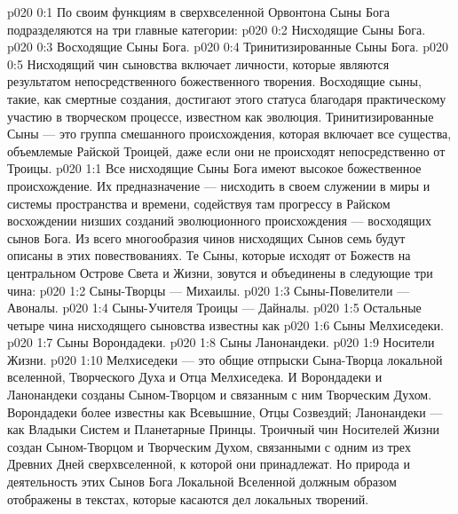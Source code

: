 \author{Совершенствователь Мудрости}
\vs p020 0:1 По своим функциям в сверхвселенной Орвонтона Сыны Бога подразделяются на три главные категории:
\vs p020 0:2 \bibnobreakspace Нисходящие Сыны Бога.
\vs p020 0:3 \bibnobreakspace Восходящие Сыны Бога.
\vs p020 0:4 \bibnobreakspace Тринитизированные Сыны Бога.
\vs p020 0:5 \pc Нисходящий чин сыновства включает личности, которые являются результатом непосредственного божественного творения. Восходящие сыны, такие, как смертные создания, достигают этого статуса благодаря практическому участию в творческом процессе, известном как эволюция. Тринитизированные Сыны --- это группа смешанного происхождения, которая включает все существа, объемлемые Райской Троицей, даже если они не происходят непосредственно от Троицы.
\vs p020 1:1 Все нисходящие Сыны Бога имеют высокое божественное происхождение. Их предназначение --- нисходить в своем служении в миры и системы пространства и времени, содействуя там прогрессу в Райском восхождении низших созданий эволюционного происхождения --- восходящих сынов Бога. Из всего многообразия чинов нисходящих Сынов семь будут описаны в этих повествованиях. Те Сыны, которые исходят от Божеств на центральном Острове Света и Жизни, зовутся  и объединены в следующие три чина:
\vs p020 1:2 \bibnobreakspace Сыны\hyp{}Творцы --- Михаилы.
\vs p020 1:3 \bibnobreakspace Сыны\hyp{}Повелители --- Авоналы.
\vs p020 1:4 \bibnobreakspace Сыны\hyp{}Учителя Троицы --- Дайналы.
\vs p020 1:5 \pc Остальные четыре чина нисходящего сыновства известны как 
\vs p020 1:6 \bibnobreakspace Сыны Мелхиседеки.
\vs p020 1:7 \bibnobreakspace Сыны Ворондадеки.
\vs p020 1:8 \bibnobreakspace Сыны Ланонандеки.
\vs p020 1:9 \bibnobreakspace Носители Жизни.
\vs p020 1:10 \pc Мелхиседеки --- это общие отпрыски Сына\hyp{}Творца локальной вселенной, Творческого Духа и Отца Мелхиседека. И Ворондадеки и Ланонандеки созданы Сыном\hyp{}Творцом и связанным с ним Творческим Духом. Ворондадеки более известны как Всевышние, Отцы Созвездий; Ланонандеки --- как Владыки Систем и Планетарные Принцы. Троичный чин Носителей Жизни создан Сыном\hyp{}Творцом и Творческим Духом, связанными с одним из трех Древних Дней сверхвселенной, к которой они принадлежат. Но природа и деятельность этих Сынов Бога Локальной Вселенной должным образом отображены в текстах, которые касаются дел локальных творений.
